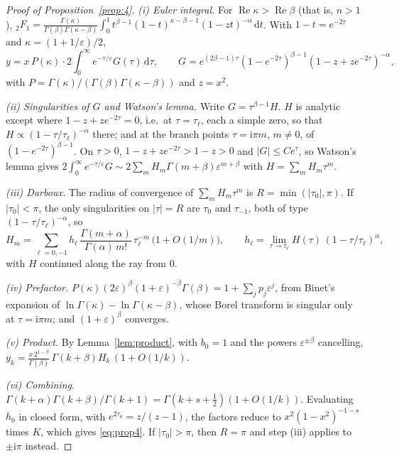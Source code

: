 \documentclass{amsart}
\numberwithin{equation}{section}
\theoremstyle{plain}
\theoremstyle{definition}
\theoremstyle{remark}
\newcommand{\eps}{\varepsilon}
\newcommand{\re}{\operatorname{Re}}
\newcommand{\iu}{\mathrm{i}}
\newcommand{\dd}{\mathrm{d}}
\begin{document}
\begin{proof}[Proof of Proposition~\ref{prop:4}]
\emph{(i) Euler integral.} For $\re\kappa > \re\beta$ (that is, $n > 1$),
${}_2F_1 = \frac{\Gamma(\kappa)}{\Gamma(\beta)\Gamma(\kappa-\beta)}\int_0^1 t^{\beta-1}(1-t)^{\kappa-\beta-1}(1-zt)^{-\alpha}\,\dd t$.
With $1 - t = e^{-2\tau}$ and $\kappa = (1 + 1/\eps)/2$,
\[
y = x\,P(\kappa)\cdot 2\int_0^\infty e^{-\tau/\eps}G(\tau)\,\dd\tau,\qquad
G = e^{(2\beta-1)\tau}(1-e^{-2\tau})^{\beta-1}(1-z+ze^{-2\tau})^{-\alpha},
\]
with $P = \Gamma(\kappa)/(\Gamma(\beta)\Gamma(\kappa-\beta))$ and $z = x^2$.

\emph{(ii) Singularities of $G$ and Watson's lemma.} Write $G = \tau^{\beta-1}H$. $H$ is analytic except where
$1 - z + ze^{-2\tau} = 0$, i.e.\ at $\tau = \tau_\ell$, each a simple zero, so that $H \propto (1-\tau/\tau_\ell)^{-\alpha}$
there; and at the branch points $\tau = \iu\pi m$, $m \ne 0$, of $(1-e^{-2\tau})^{\beta-1}$. On $\tau > 0$,
$1 - z + ze^{-2\tau} > 1 - z > 0$ and $|G| \le Ce^{\tau}$, so Watson's lemma gives
$2\int_0^\infty e^{-\tau/\eps}G \sim 2\sum_m H_m\Gamma(m+\beta)\eps^{m+\beta}$ with $H = \sum_m H_m\tau^m$.

\emph{(iii) Darboux.} The radius of convergence of $\sum_m H_m\tau^m$ is $R = \min(|\tau_0|, \pi)$. If $|\tau_0| < \pi$,
the only singularities on $|\tau| = R$ are $\tau_0$ and $\tau_{-1}$, both of type $(1-\tau/\tau_\ell)^{-\alpha}$, so
\[
H_m = \sum_{\ell=0,-1} h_\ell\,\frac{\Gamma(m+\alpha)}{\Gamma(\alpha)\,m!}\,\tau_\ell^{-m}\,\big(1+O(1/m)\big),\qquad
h_\ell = \lim_{\tau\to\tau_\ell}H(\tau)\,(1-\tau/\tau_\ell)^{\alpha},
\]
with $H$ continued along the ray from $0$.

\emph{(iv) Prefactor.} $P(\kappa)(2\eps)^{\beta}(1+\eps)^{-\beta}\Gamma(\beta) = 1 + \sum_j p_j\eps^j$, from Binet's
expansion of $\ln\Gamma(\kappa) - \ln\Gamma(\kappa-\beta)$, whose Borel transform is singular only at $\tau = \iu\pi m$;
and $(1+\eps)^{\beta}$ converges.

\emph{(v) Product.} By Lemma~\ref{lem:product}, with $b_0 = 1$ and the powers $\eps^{\pm\beta}$ cancelling,
$y_k = \frac{x\,2^{1-\beta}}{\Gamma(\beta)}\,\Gamma(k+\beta)H_k\,(1+O(1/k))$.

\emph{(vi) Combining.} $\Gamma(k+\alpha)\Gamma(k+\beta)/\Gamma(k+1) = \Gamma(k+s+\tfrac12)(1+O(1/k))$. Evaluating $h_0$ in
closed form, with $e^{2\tau_0} = z/(z-1)$, the factors reduce to $x^2(1-x^2)^{-1-s}$ times $K$, which gives
\eqref{eq:prop4}. If $|\tau_0| > \pi$, then $R = \pi$ and step (iii) applies to $\pm\iu\pi$ instead.
\end{proof}
\end{document}
